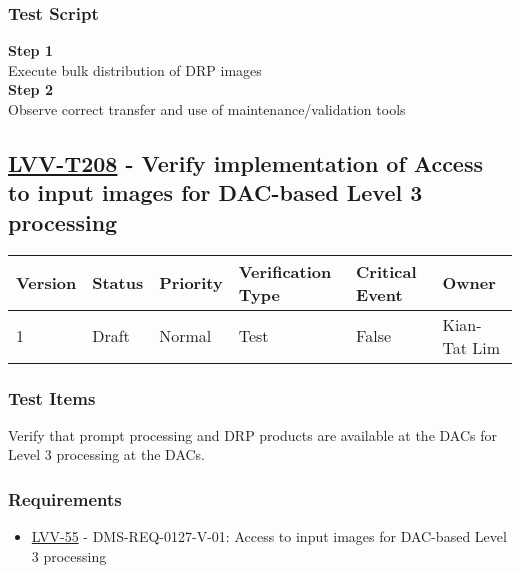 \subsubsection{Test Script}\label{test-script-64}

\textbf{Step 1}\\
Execute bulk distribution of DRP images\\[2\baselineskip]\textbf{Step
2}\\
Observe correct transfer and use of maintenance/validation
tools\\[2\baselineskip]

\hypertarget{lvv-t208---verify-implementation-of-access-to-input-images-for-dac-based-level-3-processing}{\subsection{\texorpdfstring{\href{https://jira.lsstcorp.org/secure/Tests.jspa\#/testCase/LVV-T208}{LVV-T208}
- Verify implementation of Access to input images for DAC-based Level 3
processing}{LVV-T208 - Verify implementation of Access to input images for DAC-based Level 3 processing}}\label{lvv-t208---verify-implementation-of-access-to-input-images-for-dac-based-level-3-processing}}

\begin{longtable}[]{@{}llllll@{}}
\toprule
Version & Status & Priority & Verification Type & Critical Event &
Owner\tabularnewline
\midrule
\endhead
1 & Draft & Normal & Test & False & Kian-Tat Lim\tabularnewline
\bottomrule
\end{longtable}

\subsubsection{Test Items}\label{test-items-64}

Verify that prompt processing and DRP products are available at the DACs
for Level 3 processing at the DACs.

\subsubsection{Requirements}\label{requirements-65}

\begin{itemize}
\tightlist
\item
  \href{https://jira.lsstcorp.org/browse/LVV-55}{LVV-55} -
  DMS-REQ-0127-V-01: Access to input images for DAC-based Level 3
  processing
\end{itemize}


